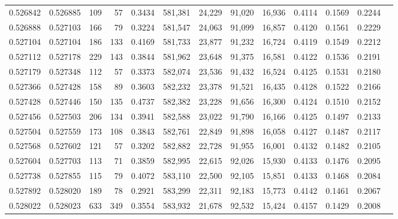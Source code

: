 \begin{tabular}{rrrrrrrrrrrrr}
0.526842 & 0.526885 &   109 &    57 &                                     0.3434 & 581,381 &  24,229 &  91,020 &  16,936 & 0.4114 & 0.1569 & 0.2244 \\
0.526888 & 0.527103 &   166 &    79 &                                     0.3224 & 581,547 &  24,063 &  91,099 &  16,857 & 0.4120 & 0.1561 & 0.2229 \\
0.527104 & 0.527104 &   186 &   133 &                                     0.4169 & 581,733 &  23,877 &  91,232 &  16,724 & 0.4119 & 0.1549 & 0.2212 \\
0.527112 & 0.527178 &   229 &   143 &                                     0.3844 & 581,962 &  23,648 &  91,375 &  16,581 & 0.4122 & 0.1536 & 0.2191 \\
0.527179 & 0.527348 &   112 &    57 &                                     0.3373 & 582,074 &  23,536 &  91,432 &  16,524 & 0.4125 & 0.1531 & 0.2180 \\
0.527366 & 0.527428 &   158 &    89 &                                     0.3603 & 582,232 &  23,378 &  91,521 &  16,435 & 0.4128 & 0.1522 & 0.2166 \\
0.527428 & 0.527446 &   150 &   135 &                                     0.4737 & 582,382 &  23,228 &  91,656 &  16,300 & 0.4124 & 0.1510 & 0.2152 \\
0.527456 & 0.527503 &   206 &   134 &                                     0.3941 & 582,588 &  23,022 &  91,790 &  16,166 & 0.4125 & 0.1497 & 0.2133 \\
0.527504 & 0.527559 &   173 &   108 &                                     0.3843 & 582,761 &  22,849 &  91,898 &  16,058 & 0.4127 & 0.1487 & 0.2117 \\
0.527568 & 0.527602 &   121 &    57 &                                     0.3202 & 582,882 &  22,728 &  91,955 &  16,001 & 0.4132 & 0.1482 & 0.2105 \\
0.527604 & 0.527703 &   113 &    71 &                                     0.3859 & 582,995 &  22,615 &  92,026 &  15,930 & 0.4133 & 0.1476 & 0.2095 \\
0.527738 & 0.527855 &   115 &    79 &                                     0.4072 & 583,110 &  22,500 &  92,105 &  15,851 & 0.4133 & 0.1468 & 0.2084 \\
0.527892 & 0.528020 &   189 &    78 &                                     0.2921 & 583,299 &  22,311 &  92,183 &  15,773 & 0.4142 & 0.1461 & 0.2067 \\
0.528022 & 0.528023 &   633 &   349 &                                     0.3554 & 583,932 &  21,678 &  92,532 &  15,424 & 0.4157 & 0.1429 & 0.2008 \\

\end{tabular}
